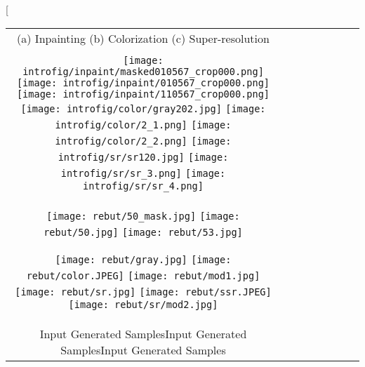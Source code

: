 \documentclass[10pt,twocolumn,letterpaper]{article}
\begin{document}
\twocolumn[{%
\renewcommand\twocolumn[1][]{#1}%
\maketitle
\vspace{1.5cm}
\vspace{-3\baselineskip}
\vspace{-3\baselineskip}
\begin{center}
\centering
\setlength{\tabcolsep}{0.5pt}
\captionsetup{type=figure}
{\footnotesize
\renewcommand{\arraystretch}{0.5} 
\begin{tabular}{c c c c c c c c  }
 \tabularnewline
        {(a) Inpainting \hspace{120pt}(b)
         Colorization \hspace{120pt}(c)
        Super-resolution}\\
    \tabularnewline   

 \texttt{[image: introfig/inpaint/masked010567\_crop000.png]}
 \hspace{0.5mm}
 \texttt{[image: introfig/inpaint/010567\_crop000.png]}  \texttt{[image: introfig/inpaint/110567\_crop000.png]}
   \hspace{2mm}
 \texttt{[image: introfig/color/gray202.jpg]} 
  \hspace{0.5mm}
 \texttt{[image: introfig/color/2\_1.png]}
 \texttt{[image: introfig/color/2\_2.png]}
\hspace{2mm}
 \texttt{[image: introfig/sr/sr120.jpg]}
  \hspace{0.5mm}
 \texttt{[image: introfig/sr/sr\_3.png]}  \texttt{[image: introfig/sr/sr\_4.png]}
    \tabularnewline
    \hspace{-0.6mm}
 \texttt{[image: rebut/50\_mask.jpg]}
  \hspace{0.5mm}
  \texttt{[image: rebut/50.jpg]}
    \texttt{[image: rebut/53.jpg]}
 
  \hspace{2mm}
 \texttt{[image: rebut/gray.jpg]}
  \hspace{0.5mm}
 \texttt{[image: rebut/color.JPEG]}  \texttt{[image: rebut/mod1.jpg]}  
\hspace{2mm}
 \texttt{[image: rebut/sr.jpg]}
  \hspace{0.5mm}
 \texttt{[image: rebut/ssr.JPEG]}  \texttt{[image: rebut/sr/mod2.jpg]}
\tabularnewline
        { Input  \hspace{35pt} Generated Samples\hspace{50pt }Input  \hspace{35pt} Generated Samples\hspace{50pt }Input  \hspace{35pt} Generated Samples
        }\\


\end{tabular}}
\end{center}}
\end{document}
